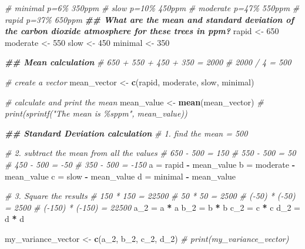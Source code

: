 \documentclass[
]{article}
\newenvironment{Shaded}{\begin{snugshade}}{\end{snugshade}}
\newcommand{\CommentTok}[1]{\textcolor[rgb]{0.56,0.35,0.01}{\textit{#1}}}
\newcommand{\DecValTok}[1]{\textcolor[rgb]{0.00,0.00,0.81}{#1}}
\newcommand{\DocumentationTok}[1]{\textcolor[rgb]{0.56,0.35,0.01}{\textbf{\textit{#1}}}}
\newcommand{\FunctionTok}[1]{\textcolor[rgb]{0.13,0.29,0.53}{\textbf{#1}}}
\newcommand{\NormalTok}[1]{#1}
\newcommand{\OtherTok}[1]{\textcolor[rgb]{0.56,0.35,0.01}{#1}}
\newcommand{\SpecialCharTok}[1]{\textcolor[rgb]{0.81,0.36,0.00}{\textbf{#1}}}
\begin{document}
\begin{Shaded}
\begin{Highlighting}[]
\CommentTok{\# minimal p=6\% 350ppm}
\CommentTok{\# slow p=10\% 450ppm}
\CommentTok{\# moderate p=47\% 550ppm}
\CommentTok{\# rapid p=37\% 650ppm}
\DocumentationTok{\#\# What are the mean and standard deviation of the carbon dioxide atmosphere for these trees in ppm? }
\NormalTok{rapid }\OtherTok{\textless{}{-}} \DecValTok{650}
\NormalTok{moderate }\OtherTok{\textless{}{-}} \DecValTok{550}
\NormalTok{slow }\OtherTok{\textless{}{-}} \DecValTok{450}
\NormalTok{minimal }\OtherTok{\textless{}{-}} \DecValTok{350}

\DocumentationTok{\#\# Mean calculation}
\CommentTok{\# 650 + 550 + 450 + 350 = 2000}
\CommentTok{\# 2000 / 4 = 500}

\CommentTok{\# create a vector}
\NormalTok{mean\_vector }\OtherTok{\textless{}{-}} \FunctionTok{c}\NormalTok{(rapid, moderate, slow, minimal)}

\CommentTok{\# calculate and print the mean}
\NormalTok{mean\_value }\OtherTok{\textless{}{-}} \FunctionTok{mean}\NormalTok{(mean\_vector)}
\CommentTok{\# print(sprintf("The mean is \%sppm", mean\_value))}



\DocumentationTok{\#\# Standard Deviation calculation}
\CommentTok{\# 1. find the mean  = 500}

\CommentTok{\# 2. subtract the mean from all the values}
  \CommentTok{\# 650 {-} 500 = 150}
  \CommentTok{\# 550 {-} 500 = 50 }
  \CommentTok{\# 450 {-} 500 = {-}50}
  \CommentTok{\# 350 {-} 500 = {-}150}
\NormalTok{a }\OtherTok{=}\NormalTok{ rapid }\SpecialCharTok{{-}}\NormalTok{ mean\_value}
\NormalTok{b }\OtherTok{=}\NormalTok{ moderate }\SpecialCharTok{{-}}\NormalTok{ mean\_value}
\NormalTok{c }\OtherTok{=}\NormalTok{ slow }\SpecialCharTok{{-}}\NormalTok{ mean\_value}
\NormalTok{d }\OtherTok{=}\NormalTok{ minimal }\SpecialCharTok{{-}}\NormalTok{ mean\_value}

\CommentTok{\# 3. Square the results}
  \CommentTok{\# 150 * 150 = 22500}
  \CommentTok{\# 50 * 50 = 2500}
  \CommentTok{\# ({-}50) * ({-}50) = 2500}
  \CommentTok{\# ({-}150) * ({-}150) = 22500}
\NormalTok{a\_2 }\OtherTok{=}\NormalTok{ a }\SpecialCharTok{*}\NormalTok{ a}
\NormalTok{b\_2 }\OtherTok{=}\NormalTok{ b }\SpecialCharTok{*}\NormalTok{ b}
\NormalTok{c\_2 }\OtherTok{=}\NormalTok{ c }\SpecialCharTok{*}\NormalTok{ c}
\NormalTok{d\_2 }\OtherTok{=}\NormalTok{ d }\SpecialCharTok{*}\NormalTok{ d}

\NormalTok{my\_variance\_vector }\OtherTok{\textless{}{-}} \FunctionTok{c}\NormalTok{(a\_2, b\_2, c\_2, d\_2)}
\CommentTok{\# print(my\_variance\_vector)}


\end{Highlighting}
\end{Shaded}
\end{document}

